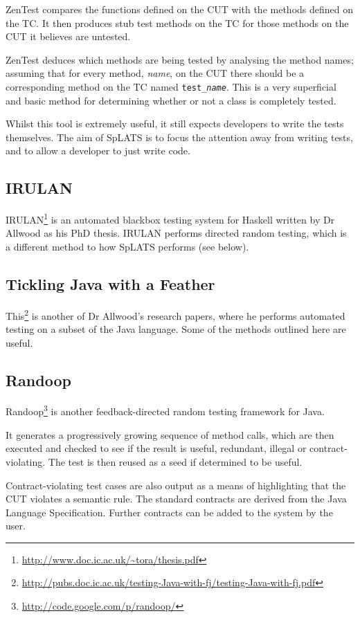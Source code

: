     ZenTest compares the functions defined on the CUT with the methods defined
on the TC. It then produces stub test methods on the TC for those methods on the
CUT it believes are untested.

ZenTest deduces which methods are being tested by analysing the method names; assuming that for every method, \emph{name}, on the CUT there should be a corresponding method on the TC named \texttt{test\_\emph{name}}. This is a very superficial and basic method for determining whether or not a class is completely tested.

    Whilst this tool is extremely useful, it still expects developers to write
the tests themselves. The aim of SpLATS is to focus the attention away from
writing tests, and to allow a developer to just write code.

  \subsection{IRULAN}
    IRULAN\footnote{\url{http://www.doc.ic.ac.uk/~tora/thesis.pdf}} is an automated blackbox testing system for Haskell written by Dr Allwood as his PhD thesis.
    IRULAN performs directed random testing, which is a different method to how SpLATS performs (see below).

  \subsection{Tickling Java with a Feather}
    This\footnote{\url{http://pubs.doc.ic.ac.uk/testing-Java-with-fj/testing-Java-with-fj.pdf}} is another of Dr Allwood's research papers, where he performs automated testing on a subset of the Java language.
    Some of the methods outlined here are useful.

  \subsection{Randoop}
    Randoop\footnote{\url{http://code.google.com/p/randoop/}} is another
feedback-directed random testing framework for Java.

    It generates a progressively growing sequence of method calls, which are
then executed and checked to see if the result is useful, redundant, illegal or
contract-violating. The test is then reused as a seed if determined to be
useful.

    Contract-violating test cases are also output as a means of highlighting
that the CUT violates a semantic rule. The standard contracts are derived from
the Java Language Specification. Further contracts can be added to the system by
the user.


